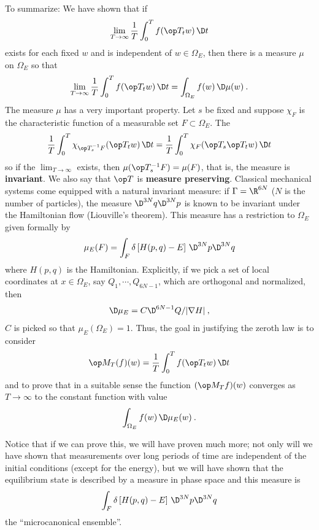 To summarize: We have shown that if
\begin{align}
    \lim_{T \rightarrow \infty} \frac{1}{T} \int_0^T f(\op T_t w) \, \D t
\end{align}
exists for each fixed $w$ and is independent of $w \in \Omega_E$, then there is a measure $\mu$ on $\Omega_E$ so that
\begin{align}
    \lim_{T \rightarrow \infty} \frac{1}{T} \int_0^T f(\op T_t w) \, \D t = \int_{\Omega_E} f(w) \, \D \mu(w) \:.
\end{align}
The measure $\mu$ has a very important property. Let $s$ be fixed and suppose $\chi_F$ is the characteristic function of a measurable set $F \subset \Omega_E$. The \begin{align}
    \frac{1}{T} \int_0^T \chi_{\op T_s^{-1} F} (\op T_t w) \, \D t = \frac{1}{T} \int_0^T \chi_F (\op T_s \op T_t w) \, \D t
\end{align}
so if the $\lim_{T \rightarrow \infty}$ exists, then $\mu(\op T_s^{-1}F) = \mu(F)$, that is, the measure is \textbf{invariant}. We also say that $\op T$ is \textbf{measure preserving}. Classical mechanical systems come equipped with a natural invariant measure: if $\Gamma = \R^{6N}$ ($N$ is the number of particles), the measure $\D^{3N} q \D^{3N} p$ is known to be invariant under the Hamiltonian flow (Liouville’s theorem). This measure has a restriction to $\Omega_E$ given formally by
\begin{align}
    \mu_E(F) = \int_F \delta \left[ H(p,q) - E \right] \, \D^{3N} p \D^{3N} q
\end{align}
where $H(p,q)$ is the Hamiltonian.
Explicitly, if we pick a set of local coordinates at $x \in \Omega_E$, say $Q_1, \cdots, Q_{6N-1}$, which are orthogonal and normalized, then
\begin{align}
    \D \mu_E = C \D^{6N-1} Q/ |\nabla H| \:,
\end{align}
$C$ is picked so that $\mu_E(\Omega_E) = 1$. Thus, the goal in justifying the zeroth law is to consider \begin{align}
    \op M_T(f)(w) = \frac{1}{T} \int_0^T f(\op T_t w) \, \D t
\end{align}
and to prove that in a suitable sense the function $(\op M_T f)(w)$ converges as $T \rightarrow \infty$ to the constant function with value
\begin{align}
    \int_{\Omega_E} f(w) \, \D \mu_E(w) \:.
\end{align}

Notice that if we can prove this, we will have proven much more; not only will we have shown that measurements over long periods of time are independent of the initial conditions (except for the energy), but we will have shown that the equilibrium state is described by a measure in phase space and this measure is
\begin{align}
    \int_F \delta \left[ H(p,q) - E \right] \, \D^{3N} p \D^{3N} q
\end{align}
the \enquote{microcanonical ensemble}.

